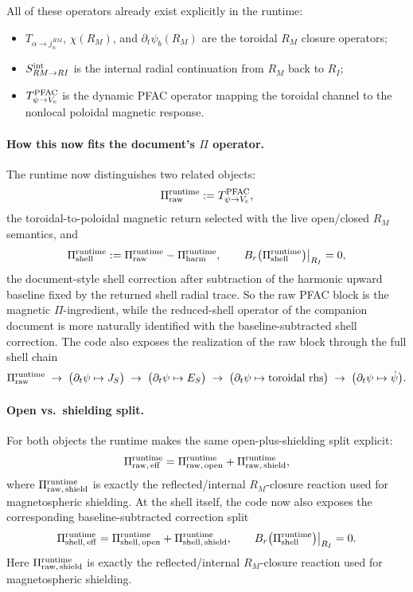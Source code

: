 \documentclass[11pt,a4paper]{article}
\begin{document}
All of these operators already exist explicitly in the runtime:
\begin{itemize}
\item \(T_{\alpha\to j_n^{RM}}\), \(\chi(R_M)\), and
\(\partial_t\psi_b(R_M)\) are the toroidal \(R_M\) closure operators;
\item \(S_{RM\to RI}^{\rm int}\) is the internal radial continuation from
\(R_M\) back to \(R_I\);
\item \(T_{\psi\to V_e}^{\rm PFAC}\) is the dynamic PFAC operator mapping the
toroidal channel to the nonlocal poloidal magnetic response.
\end{itemize}

\paragraph{How this now fits the document's \(\Pi\) operator.}
The runtime now distinguishes two related objects:
\[
\Pi_{\rm raw}^{\rm runtime}:=T_{\psi\to V_e}^{\rm PFAC},
\]
the toroidal-to-poloidal magnetic return selected with the live open/closed
\(R_M\) semantics, and
\[
\Pi_{\rm shell}^{\rm runtime}
:=
\Pi_{\rm raw}^{\rm runtime}-\Pi_{\rm harm}^{\rm runtime},
\qquad
B_r\bigl(\Pi_{\rm shell}^{\rm runtime}\bigr)\big|_{R_I}=0,
\]
the document-style shell correction after subtraction of the harmonic upward
baseline fixed by the returned shell radial trace. So the raw PFAC block is
the magnetic \(\Pi\)-ingredient, while the reduced-shell operator of the
companion document is more naturally identified with the baseline-subtracted
shell correction. The code also exposes the realization of the raw block
through the full shell chain
\[
\Pi_{\rm raw}^{\rm runtime}
\;\to\;
\bigl(\partial_t\psi \mapsto J_S\bigr)
\;\to\;
\bigl(\partial_t\psi \mapsto E_S\bigr)
\;\to\;
\bigl(\partial_t\psi \mapsto \text{toroidal rhs}\bigr)
\;\to\;
\bigl(\partial_t\psi \mapsto \dot\psi\bigr).
\]

\paragraph{Open vs.\ shielding split.}
For both objects the runtime makes the same open-plus-shielding split explicit:
\[
\Pi_{{\rm raw},\,\rm eff}^{\rm runtime}
=
\Pi_{{\rm raw},\,\rm open}^{\rm runtime}
+
\Pi_{{\rm raw},\,\rm shield}^{\rm runtime},
\]
where \(\Pi_{{\rm raw},\,\rm shield}^{\rm runtime}\) is exactly the
reflected/internal \(R_M\)-closure reaction used for magnetospheric shielding.
At the shell itself, the code now also exposes the corresponding
baseline-subtracted correction split
\[
\Pi_{{\rm shell},\,\rm eff}^{\rm runtime}
=
\Pi_{{\rm shell},\,\rm open}^{\rm runtime}
+
\Pi_{{\rm shell},\,\rm shield}^{\rm runtime},
\qquad
B_r\bigl(\Pi_{\rm shell}^{\rm runtime}\bigr)\big|_{R_I}=0.
\]
Here \(\Pi_{{\rm raw},\,\rm shield}^{\rm runtime}\) is exactly the
reflected/internal \(R_M\)-closure reaction used for magnetospheric shielding.
\end{document}
